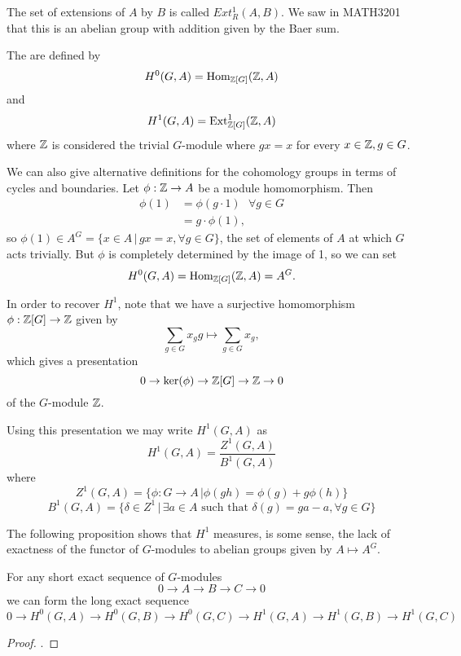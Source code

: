 \documentclass[12pt, a4paper]{report}
\begin{document}
The set of extensions of $A$ by $B$ is called $Ext^1_R (A,B).$ We saw in
MATH3201 that this is an abelian group with addition given by the Baer sum.

\begin{defn}
  The  are defined by
  \[H^0 (G, A) = \text{Hom}_{{\mathbb Z}[G]}({\mathbb Z}, A)\] and
  \[H^1 (G, A) = \text{Ext}^1_{{\mathbb Z}[G]} ({\mathbb Z}, A)\] where ${\mathbb Z}$ is considered the
  trivial $G$-module where $g x = x$ for every $x \in {\mathbb Z}, g \in G$. 
\end{defn}

We can also give alternative definitions for the cohomology groups in terms of
cycles and boundaries.
Let $\phi : {\mathbb Z} \rightarrow A$ be a module homomorphism. Then
\[\begin{split} \phi(1) &= \phi(g \cdot 1) \,\,\,\, \forall g \in G \\
    &= g \cdot \phi(1) , \end{split}\]
so $\phi(1) \in A^G = \{x \in A \, | \, gx = x, \forall g \in G\}$, the set
of elements of $A$ at which $G$ acts trivially. But $\phi$ is
completely determined by the image of 1, so we can set
\[ H^0 (G, A) = \text{Hom}_{{\mathbb Z}[G]}({\mathbb Z}, A) = A^G .\] 

In order to recover $H^1$, note that
we have a surjective homomorphism $\phi: {\mathbb Z}[G] \rightarrow {\mathbb Z}$ given by
\[\sum\limits_{g \in G} x_gg \mapsto \sum\limits_{g \in G} x_g,\]
which gives a presentation
\[0 \rightarrow \text{ker}(\phi) \rightarrow {\mathbb Z}[G] \rightarrow {\mathbb Z} \rightarrow 0\]
of the $G$-module ${\mathbb Z}$. 

Using this presentation we may write $H^1(G,A)$ as 
\[H^1(G, A) = \frac{Z^1(G,A)}{B^1(G,A)}\]
where
\[Z^1(G,A) = \{ \phi : G \rightarrow A \, | \phi(gh) = \phi(g) + g \phi(h)\}\]
\[B^1(G,A) = \{ \delta \in Z^1 \, | \, \exists a \in A \,\,\text{such that}\,\, \delta(g)
  = ga - a , \forall g \in G\}\]

The following proposition shows that $H^1$ measures, is some sense, the lack of
exactness of the functor of $G$-modules to abelian groups given by $A \mapsto A^G.$

\begin{prop}
  For any short exact sequence of $G$-modules
  \[ 0 \rightarrow A \rightarrow B \rightarrow C \rightarrow 0\]
  we can form the long exact sequence
  \[ 0 \rightarrow H^0(G, A) \rightarrow H^0(G,B) \rightarrow H^0(G,C)
    \rightarrow H^1(G, A) \rightarrow H^1(G,B) \rightarrow H^1(G,C) \]
\end{prop}

\begin{proof}
  \cite[See][Appendix B, Pages 416-417]{arithmetic}.
\end{proof}
\end{document}
